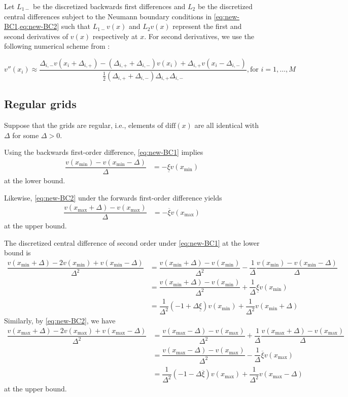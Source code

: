 \documentclass[11pt]{article}
\begin{document}
Let $L_{1-}$ be the discretized backwards first differences and $L_2$ be the discretized central differences subject to the Neumann boundary conditions in \cref{eq:new-BC1,eq:new-BC2} such that $L_{1-} v(x)$ and $L_2 v(x)$ represent the first and second derivatives of $v(x)$ respectively at $x$. For second derivatives, we use the following numerical scheme from \cite{achdou17}:

\begin{equation}
v''(x_i) \approx \dfrac{ \Delta_{i,-} v( x_i + \Delta_{i,+}) - (\Delta_{i,+} + \Delta_{i,-}) v( x_i ) + \Delta_{i,+} v( x_i - \Delta_{i,-})}{\frac{1}{2}(\Delta_{i,+} + \Delta_{i,-}) \Delta_{i,+} \Delta_{i,-} }, \text{for } i = 1, \ldots, M
\end{equation}





\subsection{Regular grids}
Suppose that the grids are regular, i.e., elements of $\text{diff}(x)$ are all identical with $\Delta$ for some $\Delta > 0$.

Using the backwards first-order difference, \eqref{eq:new-BC1} implies
\begin{align}
\dfrac{v({x_{\min}}) - v({x_{\min}}-\Delta)}{\Delta} &= - \underline{\xi} v({x_{\min}})
\end{align}
at the lower bound.

Likewise, \eqref{eq:new-BC2} under the forwards first-order difference yields
\begin{align}
\dfrac{v({x_{\max}} + \Delta) - v({x_{\max}})}{\Delta} &= - \overline{\xi} v({x_{\max}})
\end{align}
at the upper bound.

The discretized central difference of second order under \eqref{eq:new-BC1} at the lower bound is
\begin{align}
\dfrac{v ({x_{\min}} + \Delta) - 2 v({x_{\min}}) + v({x_{\min}}-\Delta)}{\Delta^2} &=   \dfrac{v({x_{\min}} + \Delta) - v({x_{\min}})}{\Delta^2} - \dfrac{1}{\Delta}\dfrac{v ({x_{\min}}) - v({x_{\min}}-\Delta) }{\Delta}  \\
&= \dfrac{v({x_{\min}} + \Delta) - v({x_{\min}})}{\Delta^2} + \dfrac{1}{\Delta} \underline{\xi} v({x_{\min}})  \\ 
&= \dfrac{1}{\Delta^2}  (- 1 + \Delta \underline{\xi}) v({x_{\min}})  + \dfrac{1}{\Delta^2}  v({x_{\min}} + \Delta)  
\end{align}
Similarly, by \eqref{eq:new-BC2}, we have
\begin{align}
\dfrac{v ({x_{\max}} + \Delta) - 2 v({x_{\max}} ) + v({x_{\max}} -\Delta)}{\Delta^2} &=   \dfrac{v({x_{\max}} - \Delta) - v({x_{\max}})}{\Delta^2} + \dfrac{1}{\Delta}\dfrac{ v({x_{\max}}+\Delta) - v ({x_{\max}}) }{\Delta}  \\
&= \dfrac{v({x_{\max}} - \Delta) - v({x_{\max}})}{\Delta^2}  - \dfrac{1}{\Delta} \overline{\xi} v({x_{\max}})  \\ 
&= \dfrac{1}{\Delta^2}  (- 1 - \Delta \overline{\xi}) v({x_{\max}})  + \dfrac{1}{\Delta^2}  v({x_{\max}} - \Delta)  
\end{align}
at the upper bound.
\end{document}
